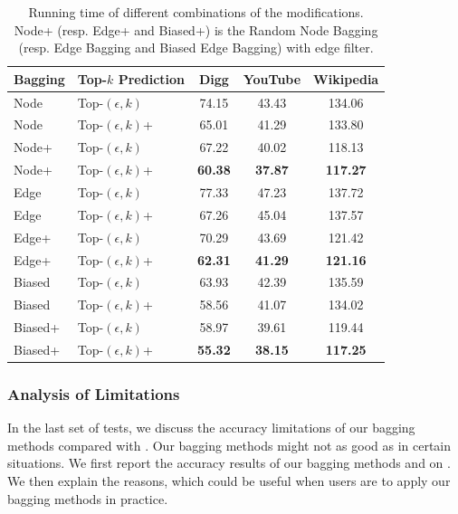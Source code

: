 \begin{table}
\caption{Running time of different combinations of the modifications. Node+
(resp. Edge+ and Biased+) is the Random Node Bagging (resp. Edge Bagging
and Biased Edge Bagging) with edge filter.}
\label{tab_improvements}
\vspace{0ex}
\centering
\newcommand{\tabincell}[2]{\begin{tabular}{@{}#1@{}}#2\end{tabular}}
\begin{tabular}{l|l|c|c|c}
\hline \hline Bagging & Top-$k$ Prediction & Digg & YouTube & Wikipedia  \\
\hline \hline
Node & Top-$(\epsilon, k)$           & 74.15    & 43.43 & 134.06  \\
Node & Top-$(\epsilon, k)$+        & 65.01    & 41.29 & 133.80 \\
Node+ & Top-$(\epsilon, k)$        & 67.22    & 40.02 & 118.13  \\
Node+ & Top-$(\epsilon, k)$+    & \textbf{60.38}   & \textbf{37.87} & \textbf{117.27} \\
\hline
Edge & Top-$(\epsilon, k)$            & 77.33   & 47.23 & 137.72  \\
Edge & Top-$(\epsilon, k)$+        & 67.26    & 45.04 & 137.57  \\
Edge+ & Top-$(\epsilon, k)$        & 70.29   & 43.69 & 121.42 \\
Edge+ & Top-$(\epsilon, k)$+    & \textbf{62.31}    & \textbf{41.29} & \textbf{121.16} \\
\hline
Biased & Top-$(\epsilon, k)$         & 63.93    & 42.39 & 135.59  \\
Biased & Top-$(\epsilon, k)$+      & 58.56    & 41.07 & 134.02  \\
Biased+ & Top-$(\epsilon, k)$      & 58.97    & 39.61 & 119.44  \\
Biased+ & Top-$(\epsilon, k)$+  & \textbf{55.32}    & \textbf{38.15} & \textbf{117.25}  \\
\hline \hline
\end{tabular}
\vspace{-0ex}
\end{table}



\subsubsection{Analysis of Limitations}
\label{subsction-exp-limit}
In the last set of tests, we discuss the accuracy limitations of our bagging methods
compared with \NMF.  Our bagging methods might not as good as \NMF in certain situations. We first report the accuracy results of our bagging methods  and  \NMF on \Flickr. We then explain the reasons, which could be useful when users are to apply our bagging methods in practice.

